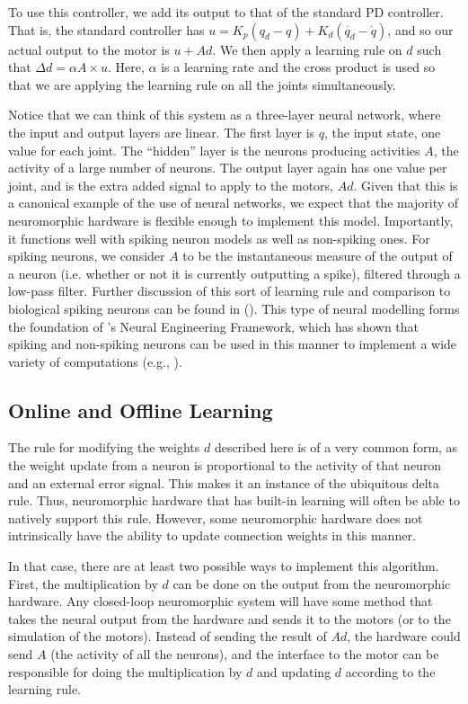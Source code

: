 \documentclass{frontiersSCNS} %
\begin{document}
To use this controller, we add its output to that of the standard PD controller.
That is, the standard controller has $u=K_p(q_d - q) + K_d(\dot{q_d} - \dot{q})$,
and so our actual output to the motor is $u + Ad$.  We then apply a learning
rule on $d$ such that $\Delta d = \alpha A \times u$.  Here, $\alpha$ is a learning
rate and the cross product is used so that we are applying the learning rule
on all the joints simultaneously.

Notice that we can think of this system as a three-layer neural
network, where the input and output layers are linear.  The first layer is $q$, the input state, one value for each joint.  The ``hidden'' layer
is the neurons producing activities $A$, the activity of a large number of neurons.  The output layer again has
one value per joint, and is the extra added signal to apply to the motors, $Ad$.
Given that this is a canonical example of the use of neural networks, we
expect that the majority of neuromorphic hardware is flexible enough to implement
this model.  Importantly, it functions well with spiking neuron models as 
well as non-spiking ones.  For spiking neurons, we consider $A$ to be the
instantaneous measure of the output of a neuron (i.e. whether or not it is currently outputting a spike),
filtered through a low-pass filter.  Further discussion of this sort of learning
rule and comparison to biological spiking neurons can be found in (\citealt{bekolay2013}).
This type of neural modelling forms the foundation of \cite{eliasmith2003}'s
Neural Engineering Framework, which has shown that spiking
and non-spiking neurons can be used in this manner to implement a wide
variety of computations (e.g., \citealt{stewart2014}).


\subsection{Online and Offline Learning}

The rule for modifying the weights $d$ described here is
of a very common form, as the weight
update from a neuron is proportional to the activity of that neuron and an
external error signal.  This makes it an instance of the ubiquitous delta rule.
Thus, neuromorphic hardware that has built-in learning will often be able to natively support this rule.
However, some neuromorphic hardware does not intrinsically have
the ability to update connection weights in this manner.

In that case, there are at least two possible ways to implement this algorithm.
First, the multiplication by $d$ can be done on the
output from the neuromorphic hardware.  Any closed-loop neuromorphic system will have some method that takes
the neural output from the hardware and sends it to the motors (or to the simulation
of the motors).  Instead of sending the result of $Ad$, the hardware could
send $A$ (the activity of all the neurons), and the interface to the motor
can be responsible for doing the multiplication by $d$ and updating $d$
according to the learning rule.
\end{document}
